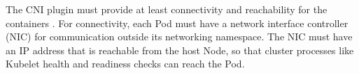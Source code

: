 \documentclass[english, 12pt, a4paper, sci, utf8, a-2b, online]{aaltothesis}
\begin{document}




The CNI plugin must provide at least connectivity and reachability for the containers \cite{cni-tkng}.
For connectivity, each Pod must have a network interface controller (NIC) for communication outside its networking namespace.
The NIC must have an IP address that is reachable from the host Node, so that cluster processes like Kubelet health and readiness checks can reach the Pod.
\end{document}
